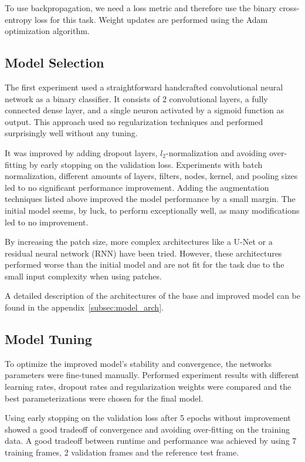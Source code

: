 \documentclass[
a4paper,     %
10pt         %
]{scrartcl}  %
\begin{document}
To use backpropagation, we need a loss metric and therefore use the binary cross-entropy loss for this task.
Weight updates are performed using the Adam optimization algorithm.

\subsection{Model Selection}
The first experiment used a straightforward handcrafted convolutional neural network as a binary classifier.
It consists of 2 convolutional layers, a fully connected dense layer, and a single neuron activated by a sigmoid function as output.
This approach used no regularization techniques and performed surprisingly well without any tuning.

It was improved by adding dropout layers, $l_2$-normalization and avoiding over-fitting by early stopping on the validation loss.
Experiments with batch normalization, different amounts of layers, filters, nodes, kernel, and pooling sizes led to no significant performance improvement.
Adding the augmentation techniques listed above improved the model performance by a small margin.
The initial model seems, by luck, to perform exceptionally well, as many modifications led to no improvement.

By increasing the patch size, more complex architectures like a U-Net or a residual neural network (RNN) have been tried.
However, these architectures performed worse than the initial model and are not fit for the task due to the small input complexity when using patches.

A detailed description of the architectures of the base and improved model can be found in the appendix~\ref{subsec:model_arch}.

\pagebreak
\subsection{Model Tuning}
To optimize the improved model's stability and convergence, the networks parameters were fine-tuned manually.
Performed experiment results with different learning rates, dropout rates and regularization weights were compared and the best parameterizations were chosen for the final model.

Using early stopping on the validation loss after 5 epochs without improvement showed a good tradeoff of convergence and avoiding over-fitting on the training data.
A good tradeoff between runtime and performance was achieved by using 7 training frames, 2 validation frames and the reference test frame.
\end{document}

